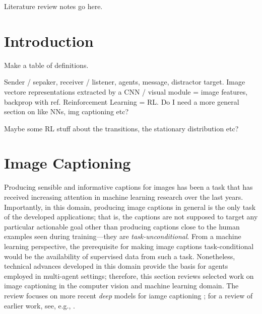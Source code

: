 Literature review notes go here. 

\section{Introduction}

Make a table of definitions.

Sender / sepaker, receiver / listener, agents, message, distractor target. Image vectore representations extracted by a CNN / visual module = image features, backprop with ref. Reinforcement Learning = RL.
Do I need a more general section on like NNs, img captioning etc?

Maybe some RL stuff about the transitions, the stationary distribution etc?


\section{Image Captioning}
Producing sensible and informative captions for images has been a task that has received increasing attention in machine learning research over the last years. Importantly, in this domain, producing image captions in general is the only task of the developed applications; that is, the captions are not supposed to target any particular actionable goal other than producing captions close to the human examples seen during training---they are \textit{task-unconditional}.  From a machine learning perspective, the prerequisite for making image captions task-conditional would be the availability of supervised data from such a task.  Nonetheless, technical advances developed in this domain provide the basis for agents employed in multi-agent settings; therefore, this section reviews selected work on image captioning in the computer vision and machine learning domain. The review focuses on more recent \textit{deep} models for iamge captioning \parencite{lecun2015deep}; for a review of earlier work, see, e.g., .

